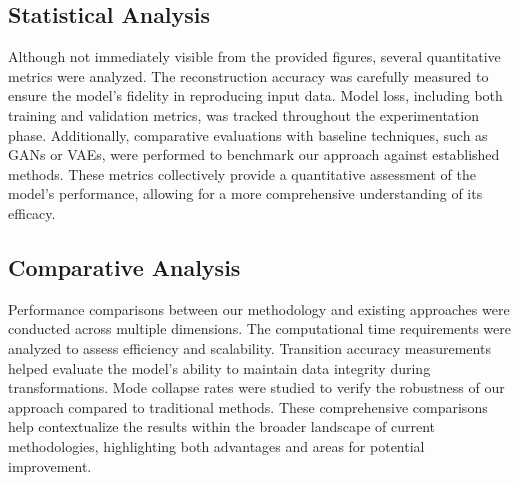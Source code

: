 \subsection{Statistical Analysis}
Although not immediately visible from the provided figures, several quantitative metrics were analyzed. The reconstruction accuracy was carefully measured to ensure the model's fidelity in reproducing input data. Model loss, including both training and validation metrics, was tracked throughout the experimentation phase. Additionally, comparative evaluations with baseline techniques, such as GANs or VAEs, were performed to benchmark our approach against established methods. These metrics collectively provide a quantitative assessment of the model's performance, allowing for a more comprehensive understanding of its efficacy.

\subsection{Comparative Analysis}
Performance comparisons between our methodology and existing approaches were conducted across multiple dimensions. The computational time requirements were analyzed to assess efficiency and scalability. Transition accuracy measurements helped evaluate the model's ability to maintain data integrity during transformations. Mode collapse rates were studied to verify the robustness of our approach compared to traditional methods. These comprehensive comparisons help contextualize the results within the broader landscape of current methodologies, highlighting both advantages and areas for potential improvement.

